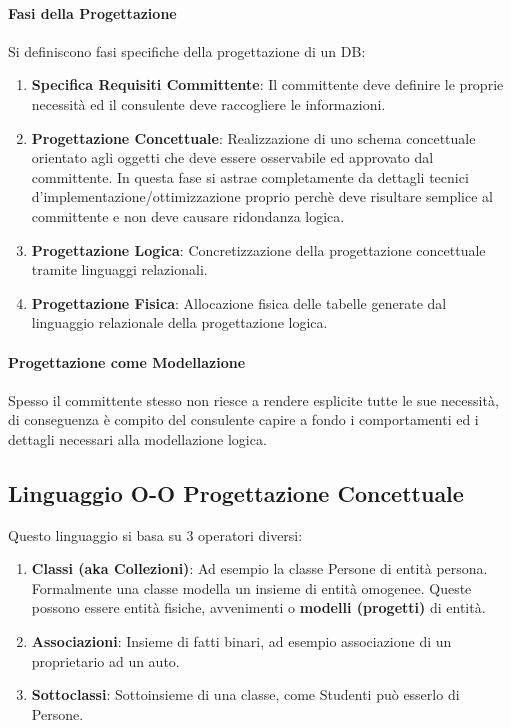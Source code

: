 \documentclass{article}
\begin{document}
\paragraph{Fasi della Progettazione} Si definiscono fasi specifiche della progettazione di un DB:

\begin{enumerate}
    \item \textbf{Specifica Requisiti Committente}: Il committente deve definire le proprie necessità ed il consulente deve
    raccogliere le informazioni.
    \item \textbf{Progettazione Concettuale}: Realizzazione di uno schema concettuale orientato agli oggetti che deve essere osservabile ed
    approvato dal committente. In questa fase si astrae completamente da dettagli tecnici d'implementazione/ottimizzazione
    proprio perchè deve risultare semplice al committente e non deve causare ridondanza logica.
    \item \textbf{Progettazione Logica}: Concretizzazione della progettazione concettuale tramite linguaggi relazionali.
    \item \textbf{Progettazione Fisica}: Allocazione fisica delle tabelle generate dal linguaggio relazionale della progettazione logica.
\end{enumerate}

\paragraph{Progettazione come Modellazione} Spesso il committente stesso non riesce a rendere esplicite tutte le sue necessità, di conseguenza
è compito del consulente capire a fondo i comportamenti ed i dettagli necessari alla modellazione logica.

\subsection{Linguaggio O-O Progettazione Concettuale}

Questo linguaggio si basa su $3$ operatori diversi:

\begin{enumerate}
    \item \textbf{Classi (aka Collezioni)}: Ad esempio la classe Persone di entità persona. Formalmente una classe modella un insieme di entità omogenee. Queste possono essere
    entità fisiche, avvenimenti o \textbf{modelli (progetti)} di entità.
    \newpage
    \item \textbf{Associazioni}: Insieme di fatti binari, ad esempio associazione di un proprietario ad un auto.
    \item \textbf{Sottoclassi}: Sottoinsieme di una classe, come Studenti può esserlo di Persone.
\end{enumerate}

\newpage

\end{document}
